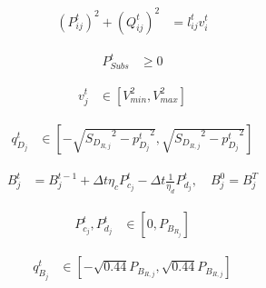 \documentclass[../../outputs/main.tex]{subfiles}
\begin{document}
\vspace{-1.5em} %

\begin{align}
    {(P_{ij}^{t})^2 + (Q_{ij}^{t})^2} &= {l_{ij}^t v_i^t} 
    \label{eq:ApparentPowerEquationBFM}
\end{align}

\vspace{-2.0em} %

\begin{align}
    {P^t_{Subs}} &\geq {0} \label{eq:substationRealPowerLimits}
\end{align}

\vspace{-2.0em} %

\begin{align}
    { v^{t}_{j} } &\in { \left[ V^{2}_{min}, V^{2}_{max} \right]} \label{eq:lim_vj}
\end{align}

\vspace{-1.5em} %

\begin{align}
    { q^{t}_{D_{j}} } 
    &\in
    { \left[-\sqrt{ {S_{D_{R, j}}}^2 - {p^{t}_{D_{j}}}^2}, \sqrt{ {S_{D_{R, j}}}^2 - {p^{t}_{D_{j}}}^2}\right] } \label{eq:qDj}
\end{align}

\vspace{-1.5em} %

\begin{align}
    {B_{j}^{t}} &= {B_{j}^{t-1} + \Delta t  \eta_c P_{c_j}^t - \Delta t\frac{1}{\eta_d} P_{d_j}^t }, \quad B_{j}^{0}=B_{j}^{T}  \label{eq:SOC-j}
\end{align}

\vspace{-1.5em} %

\begin{align}
    { P^{t}_{c_{j}}, P^{t}_{d_{j}} }
    &\in
    { \left[ 0, P_{B_{R_{j}}} \right]}\label{eq:lim_PcPdj}
\end{align}

\vspace{-1.5em} %

\begin{align}
    { q^{t}_{B_{j}} } 
    &\in 
    { \left[-\sqrt{0.44}P_{B_{R, j}}, \sqrt{0.44}P_{B_{R, j}}\right] } \label{eq:qBj}
\end{align}
\end{document}
